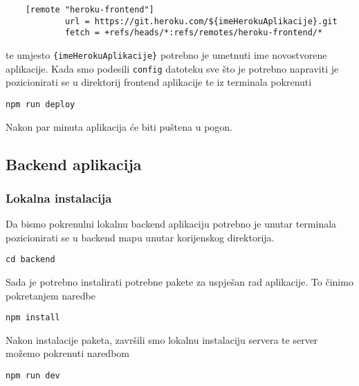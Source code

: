                 \begin{verbatim}
    [remote "heroku-frontend"]
        	url = https://git.heroku.com/${imeHerokuAplikacije}.git
        	fetch = +refs/heads/*:refs/remotes/heroku-frontend/*
								\end{verbatim}
								
								te umjesto \texttt{\{imeHerokuAplikacije\}} potrebno je umetnuti ime novostvorene aplikacije. Kada smo podesili \texttt{config} datoteku sve što je potrebno napraviti je pozicionirati se u direktorij frontend aplikacije te iz terminala pokrenuti 

								\begin{center}
										\texttt{npm run deploy}
								\end{center}
								
								Nakon par minuta aplikacija će biti puštena u pogon.

						\pagebreak
						
						\subsection{Backend aplikacija}
	        
						\subsubsection*{Lokalna instalacija}
	        
	          		Da bismo pokrenulni lokalnu backend aplikaciju potrebno je unutar terminala pozicionirati se u backend mapu unutar korijenskog direktorija. 
	            
								\begin{center}
										\texttt{cd backend}
								\end{center}
								
								Sada je potrebno instalirati potrebne pakete za uspješan rad aplikacije. To činimo pokretanjem naredbe
								
								\begin{center}
										\texttt{npm install}
								\end{center}
								
								Nakon instalacije paketa, završili smo lokalnu instalaciju servera te server možemo pokrenuti naredbom
								
								\begin{center}
										\texttt{npm run dev}
								\end{center}
								

